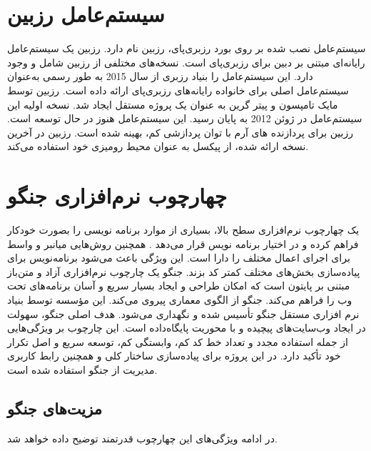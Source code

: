 {\section{سیستم‌عامل رزبین}
سیستم‌عامل نصب شده بر روی بورد رزبری‌پای، رزبین نام دارد. رزبین یک سیستم‌عامل رایانه‌ای مبتنی بر دبین برای رزبری‌پای است. نسخه‌های مختلفی از رزبین شامل  و  وجود دارد.
این سیستم‌عامل را بنیاد رزبری از سال 2015 به طور رسمی به‌عنوان سیستم‌عامل اصلی برای خانواده رایانه‌های رزبری‌پای ارائه داده است. رزبین توسط مایک تامپسون و پیتر گرین به عنوان یک پروژه مستقل ایجاد شد. نسخه اولیه این سیستم‌عامل در ژوئن 2012 به پایان رسید. این سیستم‌عامل هنوز در حال توسعه است. رزبین برای پردازنده های آرم با توان پردازشی کم، بهینه شده است. رزبین در آخرین نسخه ارائه شده، از پیکسل به عنوان محیط رومیزی خود استفاده می‌کند.

\section{چهارچوب نرم‌افزاری جنگو}
یک چهارچوب نرم‌افزاری سطح بالا، بسیاری از موارد برنامه نویسی را بصورت خودکار فراهم کرده و در اختیار برنامه نویس قرار می‌دهد . همچنین روش‌هایی میانبر و واسط برای اجرای اعمال مختلف را دارا است. این ویژگی باعث می‌شود برنامه‌نویس برای پیاده‌سازی بخش‌های مختلف کمتر کد بزند.
جنگو\cite{Django}  یک چارچوب نرم‌افزاری آزاد و متن‌باز مبتنی بر پایتون است که امکان طراحی و ایجاد بسیار سریع و آسان برنامه‌های تحت وب را فراهم می‌کند. جنگو از الگوی معماری  پیروی می‌کند. این مؤسسه توسط بنیاد نرم افزاری مستقل جنگو تأسیس شده و نگهداری می‌شود.
هدف اصلی جنگو، سهولت در ایجاد وب‌سایت‌های پیچیده و با محوریت پایگاه‌داده است. این چارچوب بر ویژگی‌هایی از جمله استفاده مجدد و تعداد خط کد کم، وابستگی کم، توسعه سریع و اصل تکرار خود تأکید دارد.
در این پروژه برای پیاده‌سازی ساختار کلی  و همچنین رابط کاربری مدیریت از جنگو استفاده شده است.

\subsection{مزیت‌های جنگو}
در ادامه ویژگی‌های این چهارچوب قدرتمند توضیح داده خواهد شد.
}
